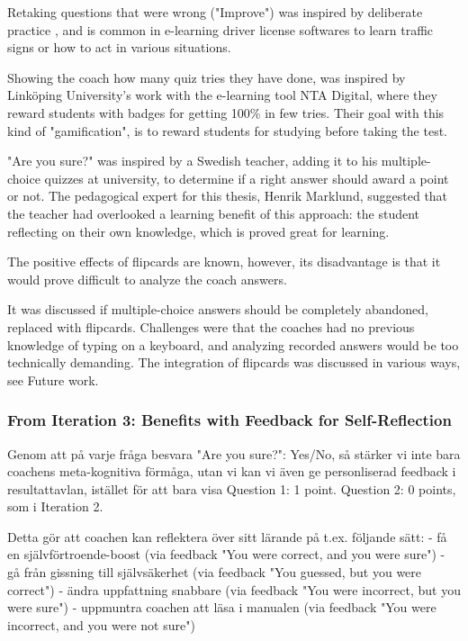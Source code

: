   Retaking questions that were wrong ("Improve") was inspired by deliberate practice \cite{sierra}, and is common in e-learning driver license softwares to learn traffic signs or how to act in various situations.

  Showing the coach how many quiz tries they have done, was inspired by Linköping University's work with the e-learning tool NTA Digital, where they reward students with badges for getting 100\% in few tries. Their goal with this kind of "gamification", is to reward students for studying before taking the test.


  "Are you sure?" was inspired by a Swedish teacher, adding it to his multiple-choice quizzes at university, to determine if a right answer should award a point or not. The pedagogical expert for this thesis, Henrik Marklund, suggested that the teacher had overlooked a learning benefit of this approach: the student reflecting on their own knowledge, which is proved great for learning.

  The positive effects of flipcards are known, however, its disadvantage is that it would prove difficult to analyze the coach answers.

  It was discussed if multiple-choice answers should be completely abandoned, replaced with flipcards. Challenges were that the coaches had no previous knowledge of typing on a keyboard, and analyzing recorded answers would be too technically demanding. The integration of flipcards was discussed in various ways, see Future work.

  \subsubsection{From Iteration 3: Benefits with Feedback for Self-Reflection}

  Genom att på varje fråga besvara "Are you sure?": Yes/No, så stärker vi inte bara coachens meta-kognitiva förmåga, utan vi kan vi även ge personliserad feedback i resultattavlan, istället för att bara visa Question 1: 1 point. Question 2: 0 points, som i Iteration 2.

    Detta gör att coachen kan reflektera över sitt lärande på t.ex. följande sätt:
    - få en självförtroende-boost (via feedback "You were correct, and you were sure")
    - gå från gissning till självsäkerhet (via feedback "You guessed, but you were correct")
    - ändra uppfattning snabbare (via feedback "You were incorrect, but you were sure")
    - uppmuntra coachen att läsa i manualen (via feedback "You were incorrect, and you were not sure")
